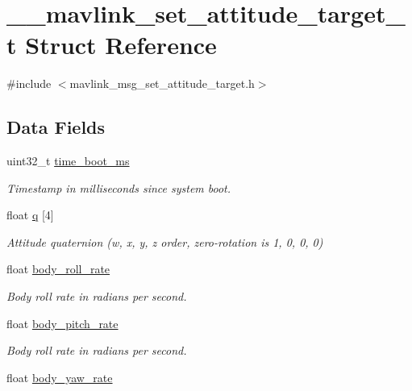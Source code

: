 \hypertarget{struct____mavlink__set__attitude__target__t}{\section{\+\_\+\+\_\+mavlink\+\_\+set\+\_\+attitude\+\_\+target\+\_\+t Struct Reference}
\label{struct____mavlink__set__attitude__target__t}
}


{\ttfamily \#include $<$mavlink\+\_\+msg\+\_\+set\+\_\+attitude\+\_\+target.\+h$>$}

\subsection*{Data Fields}
\begin{DoxyCompactItemize}
\item 
uint32\+\_\+t \hyperlink{struct____mavlink__set__attitude__target__t_a66f709687537575563c2eb503447b2b0}{time\+\_\+boot\+\_\+ms}
\begin{DoxyCompactList}\small\item\em Timestamp in milliseconds since system boot. \end{DoxyCompactList}\item 
float \hyperlink{struct____mavlink__set__attitude__target__t_abc0f04d75c8e608391690e4283323b89}{q} \mbox{[}4\mbox{]}
\begin{DoxyCompactList}\small\item\em Attitude quaternion (w, x, y, z order, zero-\/rotation is 1, 0, 0, 0) \end{DoxyCompactList}\item 
float \hyperlink{struct____mavlink__set__attitude__target__t_a8dedfb43816994d87ca00e974e2bce5f}{body\+\_\+roll\+\_\+rate}
\begin{DoxyCompactList}\small\item\em Body roll rate in radians per second. \end{DoxyCompactList}\item 
float \hyperlink{struct____mavlink__set__attitude__target__t_af0695ccb576c9d31fca650c7101ecc79}{body\+\_\+pitch\+\_\+rate}
\begin{DoxyCompactList}\small\item\em Body roll rate in radians per second. \end{DoxyCompactList}\item 
float \hyperlink{struct____mavlink__set__attitude__target__t_aedf0a49762620656be4c9c78d8d9ab76}{body\+\_\+yaw\+\_\+rate}

\end{DoxyCompactItemize}
